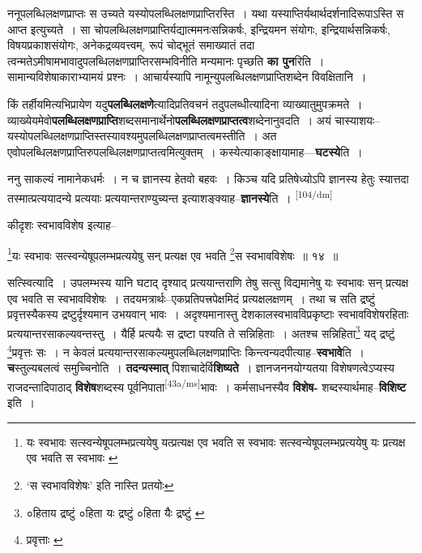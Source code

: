 \documentclass[article,12pt,a4paper]{memoir}
\begin{document}
	  \pstart ननूपलब्धिलक्षणप्राप्तः स उच्यते यस्योपलब्धिलक्षणप्राप्तिरस्ति । यथा यस्याप्तिर्यथार्थदर्शनादिरूपाऽस्ति स आप्त इत्युच्यते । सा चोपलब्धिलक्षणप्राप्तिर्यद्यात्ममनःसन्निकर्षः, इन्द्रियमन संयोगः, इन्द्रियार्थसन्निकर्षः, विषयप्रकाशसंयोगः, अनेकद्रव्यवत्त्वम्, रूपं चोद्भूतं समाख्यातं तदा त्वन्मतेऽमीषामभावादुपलब्धिलक्षणप्राप्तिरसम्भविनीति मन्यमानः पृच्छति \textbf{का पुन}रिति । सामान्यविशेषाकाराभ्यामयं प्रश्नः । आचार्यस्यापि नामून्युपलब्धिलक्षणप्राप्तिशब्देन विवक्षितानि ।
	\pend
      

	  \pstart किं तर्हीयमित्यभिप्रायेण यदु\textbf{पलब्धिलक्षणे}त्यादिप्रतिवचनं तदुपलब्धीत्यादिना व्याख्यातुमुपक्रमते । व्याख्येयमेवो\textbf{पलब्धिलक्षणप्राप्ति}शब्दसमानार्थेनो\textbf{पलब्धिलक्षणप्राप्तत्व}शब्देनानुवदति । अयं चास्याशयः--यस्योपलब्धिलक्षणप्राप्तिस्तस्यावश्यमुपलब्धिलक्षणप्राप्तत्वमस्तीति । अत एवोपलब्धिलक्षणप्राप्तिरुपलब्धिलक्षणप्राप्तत्वमित्युक्तम् । कस्येत्याकाङ्क्षायामाह—\textbf{घटस्ये}ति ।
	\pend
      

	  \pstart ननु साकल्यं नामानेकधर्मः । न च ज्ञानस्य हेतवो बहवः । किञ्च यदि प्रतिषेध्योऽपि ज्ञानस्य हेतुः स्यात्तदा तस्मात्प्रत्ययादन्ये प्रत्ययाः प्रत्ययान्तराण्युच्यन्त इत्याशङ्क्याह--\textbf{ज्ञानस्ये}ति । \leavevmode\textsuperscript{\rmlatinfont\tiny [104/dm]} 
	  
	कीदृशः स्वभावविशेष इत्याह-- 
	  
	\footnote{यः स्वभावः सत्स्वन्येषूपलम्भप्रत्ययेषु यत्प्रत्यक्ष एव भवति स स्वभावः \cite{dp-msB} \cite{dp-edP} \cite{dp-edH} सत्स्वन्येषूपलम्भप्रत्ययेषु यः प्रत्यक्ष एव भवति स स्वभावः \cite{dp-edE}}यः स्वभावः सत्स्वन्येषूपलम्भप्रत्ययेषु सन् प्रत्यक्ष एव भवति \footnote{‘स स्वभावविशेषः’ इति नास्ति \cite{dp-msC} \cite{dp-msD} प्रतयोः}स स्वभावविशेषः ॥ १४ ॥ 
	  
	सत्स्वित्यादि । उपलम्भस्य यानि घटाद् दृश्याद् प्रत्ययान्तराणि तेषु सत्सु विद्यमानेषु यः स्वभावः सन् प्रत्यक्ष एव भवति स स्वभावविशेषः । तदयमत्रार्थः--एकप्रतिपत्त्रपेक्षमिदं प्रत्यक्षलक्षणम् । तथा च सति द्रष्टुं प्रवृत्तस्यैकस्य द्रष्टुर्दृश्यमान उभयवान् भावः । अदृश्यमानास्तु देशकालस्वभावविप्रकृष्टाः स्वभावविशेषरहिताः प्रत्ययान्तरसाकल्यवन्तस्तु । यैर्हि प्रत्ययैः स द्रष्टा पश्यति ते सन्निहिताः । अतश्च सन्निहिता\footnote{०हिताय द्रष्टुं \cite{dp-msA} \cite{dp-edP} \cite{dp-edE} ०हिता यः द्रष्टुं \cite{dp-edH} ०हिता यैः द्रष्टुं \cite{dp-edN}} यद् द्रष्टुं \footnote{प्रवृत्ताः \cite{dp-msB}}प्रवृत्तः सः । न केवलं प्रत्ययान्तरसाकल्यमुपलब्धिलक्षणप्राप्तिः किन्त्वन्यदपीत्याह--\textbf{स्वभावे}ति । \textbf{च}स्तुल्यबलत्वं समुच्चिनोति । \textbf{तदन्यस्मात्} पिशाचादेर्वि\textbf{शिष्यते} । ज्ञानजननयोग्यतया विशेषणत्वेऽप्यस्य राजदन्तादिपाठाद् \textbf{विशेष}शब्दस्य पूर्वनिपाता\leavevmode\textsuperscript{\rmlatinfont\tiny [43a/ms]}भावः । कर्मसाधनस्यैव \textbf{विशेष-} शब्दस्यार्थमाह--\textbf{विशिष्ट} इति ।
	\pend
      
\end{document}
